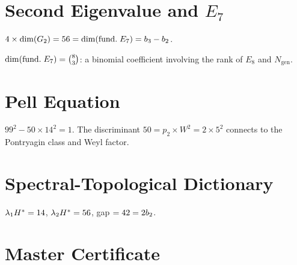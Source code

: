 \section{Second Eigenvalue and $E_7$}

\begin{theorem}[$\lambda_2 \times \Hstar = \opdim(\mathrm{fund.}\; E_7)$]\label{thm:second_ev_E7}
    \leanok
    $4 \times \mathrm{dim}(G_2) = 56 = \mathrm{dim}(\mathrm{fund.}\; E_7) = b_3 - b_2$.
\end{theorem}

\begin{theorem}[$56 = C(\mathrm{rank}(E_8), N_{\mathrm{gen}})$]\label{thm:second_ev_binom}
    \leanok
    $\mathrm{dim}(\mathrm{fund.}\; E_7) = \binom{8}{3}$: a binomial coefficient
    involving the rank of $E_8$ and $N_{\mathrm{gen}}$.
\end{theorem}

\section{Pell Equation}

\begin{theorem}\label{thm:pell_eq}
    \leanok
    $99^2 - 50 \times 14^2 = 1$. The discriminant $50 = p_2 \times W^2 = 2 \times 5^2$
    connects to the Pontryagin class and Weyl factor.
\end{theorem}

\section{Spectral-Topological Dictionary}

\begin{theorem}\label{thm:spectral_ladder}
    \leanok
    $\lambda_1 H^* = 14$, $\lambda_2 H^* = 56$,
    gap $= 42 = 2b_2$.
\end{theorem}

\section{Master Certificate}

